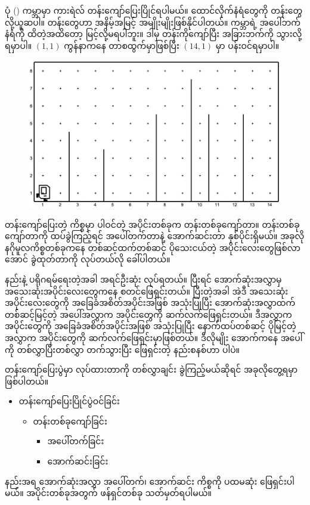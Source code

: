 ပုံ (\fRefNo{\ref{fig:hurdle_jumping_init}}) ကမ္ဘာမှာ ကားရဲလ် တန်းကျော်ပြေးပြိုင်ရပါမယ်။ ထောင်လိုက်နံရံတွေကို တန်းတွေလို့ယူဆပါ။ တန်းတွေဟာ အနိမ့်အမြင့် အမျိုးမျိုးဖြစ်နိုင်ပါတယ်။ ကမ္ဘာရဲ့ အပေါ်ဘက် နံရံကို ထိတဲ့အထိတော့ မြင့်လို့မရပါဘူး။ ဒါမှ တန်းကိုကျော်ပြီး အခြားဘက်ကို သွားလို့ရမှာပါ။ \((1, 1)\) ကွန်နာကနေ တာစထွက်မှာဖြစ်ပြီး \((14, 1)\) မှာ ပန်းဝင်ရမှာပါ။
%
\begin{figure}[htb!]
    \includegraphics[width=4.5in]{images/ch03/hurdle_jumping/init_w1.jpg}
    \caption{}
    \label{fig:hurdle_jumping_init}
\end{figure}
%

တန်းကျော်ပြေးတဲ့ ကိစ္စမှာ ပါဝင်တဲ့ အပိုင်းတစ်ခုက တန်းတစ်ခုကျော်တာ။ တန်းတစ်ခု ကျော်တာကို ထပ်ခွဲကြည့်ရင် အပေါ်တက်တာနဲ့ အောက်ဆင်းတာ နှစ်ပိုင်းရှိမယ်။ အခုလို နဂိုမူလကိစ္စတစ်ခုကနေ တစ်ဆင့်ထက်တစ်ဆင့် ပိုသေးငယ်တဲ့ အပိုင်းလေးတွေဖြစ်လာအောင် ခွဲထုတ်တာကို  လုပ်တယ်လို ခေါ်ပါတယ်။ 

 နည်းနဲ့ ပရိုဂရမ်ရေးတဲ့အခါ  အရင်ဦးဆုံး  လုပ်ရတယ်။ ပြီးရင် အောက်ဆုံးအလွှာမှ အသေးဆုံးအပိုင်းလေးတွေကနေ စတင်ဖြေရှင်းတယ်။ ပြီးတဲ့အခါ အဲဒီ အသေးဆုံး အပိုင်းလေးတွေကို အခြေခံအစိတ်အပိုင်းအဖြစ် အသုံးပြုပြီး  အောက်ဆုံးအလွှာထက် တစ်ဆင့်မြင့်တဲ့ အပေါ်အလွှာက အပိုင်းတွေကို ဆက်လက်ဖြေရှင်းတယ်။ ဒီအလွှာက အပိုင်းတွေကို  အခြေခံအစိတ်အပိုင်းအဖြစ် အသုံးပြုပြီး နောက်ထပ်တစ်ဆင့် ပိုမြင့်တဲ့အလွှာက အပိုင်းတွေကို ဆက်လက်ဖြေရှင်းမှာဖြစ်တယ်။ ဒီလိုမျိုး အောက်ကနေ အပေါ်ကို တစ်လွှာပြီးတစ်လွှာ တက်သွားပြီး ဖြေရှင်းတဲ့ နည်းစနစ်ဟာ  ပါပဲ။ 

တန်းကျော်ပြေးပွဲမှာ  လုပ်ထားတာကို တစ်လွှာချင်း ခွဲကြည့်မယ်ဆိုရင် အခုလိုတွေ့ရမှာ ဖြစ်ပါတယ်။
%
\begin{itemize}
  \item တန်းကျော်ပြေးပြိုင်ပွဲဝင်ခြင်း
  \begin{itemize}
    \item တန်းတစ်ခုကျော်ခြင်း
    \begin{itemize}
      \item အပေါ်တက်ခြင်း
      \item အောက်ဆင်းခြင်း
    \end{itemize}
  \end{itemize} 
\end{itemize}
%
 နည်းအရ အောက်ဆုံးအလွှာ အပေါ်တက်၊ အောက်ဆင်း ကိစ္စကို ပထမဆုံး ဖြေရှင်းပါမယ်။ အပိုင်းတစ်ခုအတွက် ဖန်ရှင်တစ်ခု သတ်မှတ်ရပါမယ်။

